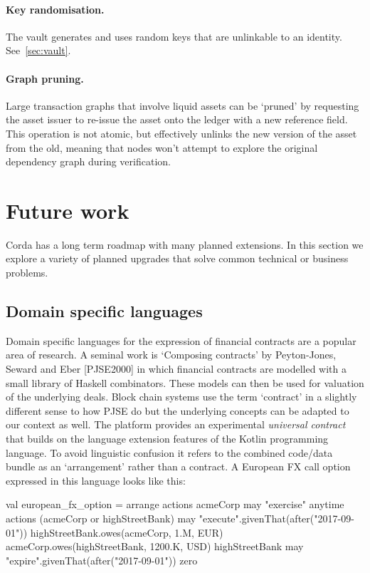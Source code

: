 \documentclass{article}
\begin{document}
\paragraph{Key randomisation.}The vault generates and uses random keys that are unlinkable to an identity. See~\cref{sec:vault}.
\paragraph{Graph pruning.}Large transaction graphs that involve liquid assets can be `pruned' by requesting the asset
issuer to re-issue the asset onto the ledger with a new reference field. This operation is not atomic, but effectively
unlinks the new version of the asset from the old, meaning that nodes won't attempt to explore the original dependency
graph during verification.

\section{Future work}

Corda has a long term roadmap with many planned extensions. In this section we explore a variety of planned upgrades
that solve common technical or business problems.

\subsection{Domain specific languages}

Domain specific languages for the expression of financial contracts are a popular area of research. A seminal work
is `Composing contracts' by Peyton-Jones, Seward and Eber [PJSE2000\cite{PeytonJones:2000:CCA:357766.351267}] in
which financial contracts are modelled with a small library of Haskell combinators. These models can then be used
for valuation of the underlying deals. Block chain systems use the term `contract' in a slightly different sense to
how PJSE do but the underlying concepts can be adapted to our context as well. The platform provides an
experimental \emph{universal contract} that builds on the language extension features of the Kotlin programming
language. To avoid linguistic confusion it refers to the combined code/data bundle as an `arrangement' rather than
a contract. A European FX call option expressed in this language looks like this:

\begin{kotlincode}
    val european_fx_option = arrange {
        actions {
            acmeCorp may {
                "exercise" anytime {
                    actions {
                        (acmeCorp or highStreetBank) may {
                            "execute".givenThat(after("2017-09-01")) {
                                highStreetBank.owes(acmeCorp, 1.M, EUR)
                                acmeCorp.owes(highStreetBank, 1200.K, USD)
                            }
                        }
                    }
                }
            }
            highStreetBank may {
                "expire".givenThat(after("2017-09-01")) {
                    zero
                }
            }
        }
    }
\end{kotlincode}
\end{document}
